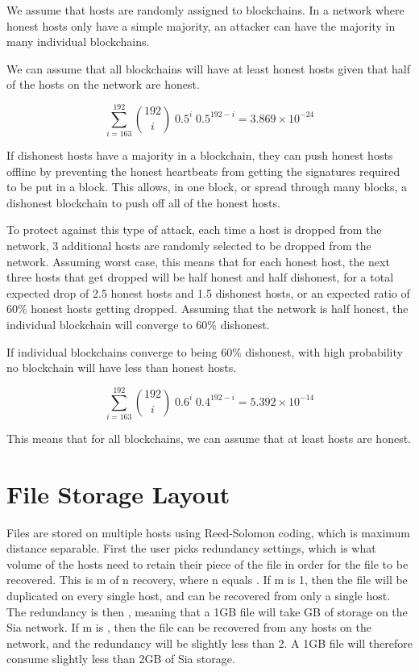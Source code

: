 \documentclass[twocolumn]{article}
\begin{document}
We assume that hosts are randomly assigned to blockchains.
In a network where honest hosts only have a simple majority, an attacker can have the majority in many individual blockchains.

We can assume that all blockchains will have at least \inversemaxcorruption{} honest hosts given that half of the hosts on the network are honest.

\begin{equation}
\sum_{i=163}^{192} {192 \choose i} \; 0.5^{i} \; 0.5^{192-i} = 3.869\times10^{-24}
\end{equation}

If dishonest hosts have a majority in a blockchain, they can push honest hosts offline by preventing the honest heartbeats from getting the signatures required to be put in a block.
This allows, in one block, or spread through many blocks, a dishonest blockchain to push off all of the honest hosts.

To protect against this type of attack, each time a host is dropped from the network, 3 additional hosts are randomly selected to be dropped from the network.
Assuming worst case, this means that for each honest host, the next three hosts that get dropped will be half honest and half dishonest, for a total expected drop of 2.5 honest hosts and 1.5 dishonest hosts, or an expected ratio of 60\% honest hosts getting dropped.
Assuming that the network is half honest, the individual blockchain will converge to 60\% dishonest.

If individual blockchains converge to being 60\% dishonest, with high probability no blockchain will have less than \inversemaxcorruption{} honest hosts.

\begin{equation}
\sum_{i=163}^{192} {192 \choose i} \; 0.6^{i} \; 0.4^{192-i} = 5.392\times10^{-14}
\end{equation}

This means that for all blockchains, we can assume that at least \inversemaxcorruption{} hosts are honest.

\section{File Storage Layout}

Files are stored on multiple hosts using Reed-Solomon coding, which is maximum distance separable.
First the user picks redundancy settings, which is what volume of the hosts need to retain their piece of the file in order for the file to be recovered.
This is m of n recovery, where n equals \numhosts.
If m is 1, then the file will be duplicated on every single host, and can be recovered from only a single host.
The redundancy is then \numhosts{}, meaning that a 1GB file will take \numhosts GB of storage on the Sia network.
If m is \fiftyone, then the file can be recovered from any \fiftyone{} hosts on the network, and the redundancy will be slightly less than 2.
A 1GB file will therefore consume slightly less than 2GB of Sia storage.
\end{document}
